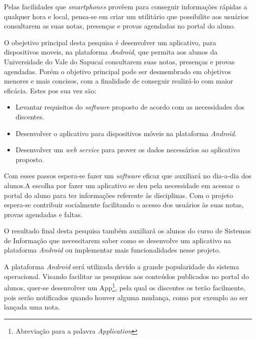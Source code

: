 	\par Pelas facilidades que \textit{smartphones} provêem para conseguir
informações rápidas a qualquer hora e local, pensa-se em criar um utilitário
que possibilite aos usuários consultarem as suas notas, presenças e provas
agendadas no portal do aluno.

	
	\par O obejetivo principal desta pesquisa é desenvolver um aplicativo,
para dispositivos moveis, na plataforma \textit{Android}, que permita aos
alunos da Universidade do Vale do Sapucaí consultarem suas notas, presenças e
provas agendadas. Porém o objetivo principal pode ser desmembrado em objetivos
menores e mais concisos, com a finalidade de conseguir realizá-lo com maior
eficácia. Estes pos sua vez são:
	
	\begin{itemize}
	  
	  \item Levantar requisitos do \textit{software} proposto de acordo com as
	  necessidades dos discentes.
	  
	  \item Desenvolver o aplicativo para dispositivos móveis na plataforma
	  \textit{Android}.
	  
	  \item Desenvolver um \textit{web service} para prover os dados necessários ao
	  aplicativo proposto.
	
	\end{itemize}
	
	\par Com esses passos espera-se fazer um \textit{software} eficaz que auxiliará
no dia-a-dia dos alunos.A escolha por fazer um aplicativo se deu pela
necessidade em acessar o portal do aluno para ter informações referente às
disciplinas. Com o projeto espera-se contribuir socialmente facilitando o
acesso dos usuários às suas notas, provas agendadas e faltas.

	\par O resultado final desta pesquisa também auxiliará os alunos do curso de
Sistemas de Informação que necessitarem saber como se desenvolve um aplicativo
na plataforma \textit{Android} ou implementar mais funcionalidades nesse
projeto.

	\par A plataforma \textit{Android} será utilizada devido a grande popularidade
do sistema operacional. Visando facilitar as pesquisas aos conteúdos publicados
no portal do alunos, quer-se desenvolver um App\footnote{Abreviação para a
palavra \textit{Application}}, pela qual os discentes os terão facilmente, pois
serão notificados quando houver alguma mudança, como por exemplo ao ser lançada
uma nota.
